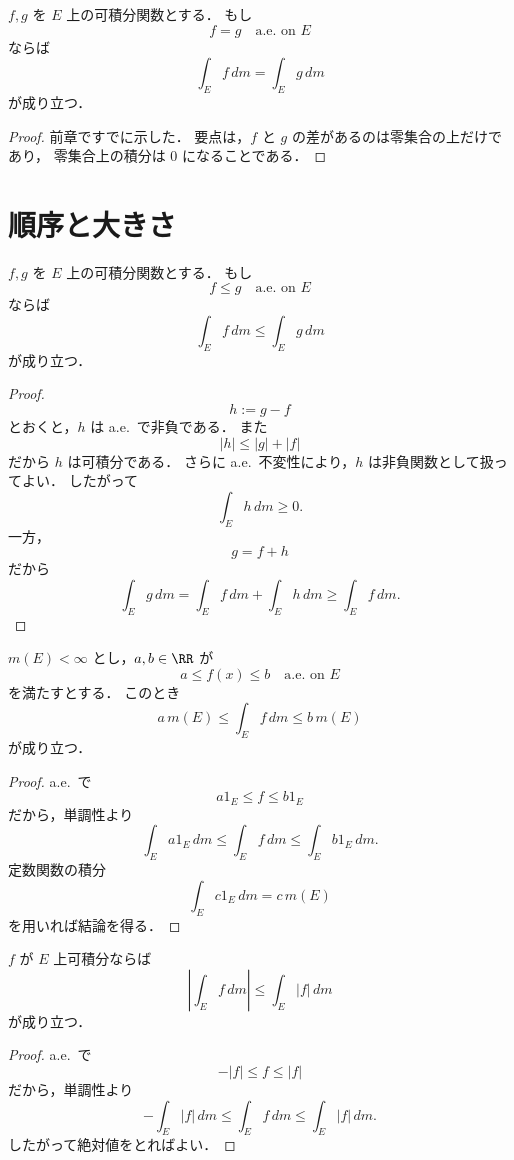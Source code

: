\begin{proposition}[a.e.\ 不変性]
$f,g$ を $E$ 上の可積分関数とする．
もし
\[
f=g \quad \text{a.e.\ on } E
\]
ならば
\[
\int_E f\,dm=\int_E g\,dm
\]
が成り立つ．
\end{proposition}
\begin{proof}
前章ですでに示した．
要点は，$f$ と $g$ の差があるのは零集合の上だけであり，
零集合上の積分は $0$ になることである．
\end{proof}

\section{順序と大きさ}

\begin{proposition}[単調性]
$f,g$ を $E$ 上の可積分関数とする．
もし
\[
f\le g \quad \text{a.e.\ on } E
\]
ならば
\[
\int_E f\,dm\le \int_E g\,dm
\]
が成り立つ．
\end{proposition}
\begin{proof}
\[
h:=g-f
\]
とおくと，$h$ は a.e.\ で非負である．
また
\[
|h|\le |g|+|f|
\]
だから $h$ は可積分である．
さらに a.e.\ 不変性により，$h$ は非負関数として扱ってよい．
したがって
\[
\int_E h\,dm\ge 0.
\]
一方，
\[
g=f+h
\]
だから
\[
\int_E g\,dm=\int_E f\,dm+\int_E h\,dm\ge \int_E f\,dm.
\]
\end{proof}

\begin{proposition}[定数による評価]
$m(E)<\infty$ とし，$a,b \in \RR$ が
\[
a\le f(x)\le b \quad \text{a.e.\ on } E
\]
を満たすとする．
このとき
\[
a\,m(E)\le \int_E f\,dm\le b\,m(E)
\]
が成り立つ．
\end{proposition}
\begin{proof}
a.e.\ で
\[
a1_E\le f\le b1_E
\]
だから，単調性より
\[
\int_E a1_E\,dm\le \int_E f\,dm\le \int_E b1_E\,dm.
\]
定数関数の積分
\[
\int_E c1_E\,dm=c\,m(E)
\]
を用いれば結論を得る．
\end{proof}

\begin{proposition}[絶対値による評価]
$f$ が $E$ 上可積分ならば
\[
\left|\int_E f\,dm\right|
\le
\int_E |f|\,dm
\]
が成り立つ．
\end{proposition}
\begin{proof}
a.e.\ で
\[
-|f|\le f\le |f|
\]
だから，単調性より
\[
-\int_E |f|\,dm
\le
\int_E f\,dm
\le
\int_E |f|\,dm.
\]
したがって絶対値をとればよい．
\end{proof}

